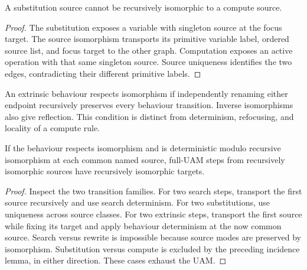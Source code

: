 

\begin{lemma}
A substitution source cannot be recursively isomorphic to a compute source.
\end{lemma}
\begin{proof}
The substitution exposes a variable with singleton source at the focus target.
The source isomorphism transports its primitive variable label, ordered source
list, and focus target to the other graph. Computation exposes an active
operation with that same singleton source. Source uniqueness identifies the
two edges, contradicting their different primitive labels.
\end{proof}


\begin{definition}
An extrinsic behaviour respects isomorphism if independently renaming either
endpoint recursively preserves every behaviour transition. Inverse
isomorphisms also give reflection. This condition is distinct from determinism,
refocusing, and locality of a compute rule.
\end{definition}


\begin{theorem}
If the behaviour respects isomorphism and is deterministic modulo recursive
isomorphism at each common named source, full-UAM steps from recursively
isomorphic sources have recursively isomorphic targets.
\end{theorem}
\begin{proof}
Inspect the two transition families. For two search steps, transport the first
source recursively and use search determinism. For two substitutions, use
uniqueness across source classes. For two extrinsic steps, transport the first
source while fixing its target and apply behaviour determinism at the now
common source. Search versus rewrite is impossible because source modes are
preserved by isomorphism. Substitution versus compute is excluded by the
preceding incidence lemma, in either direction. These cases exhaust the UAM.
\end{proof}

